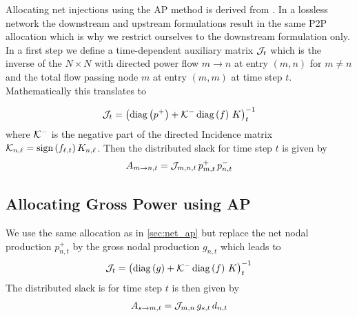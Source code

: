 \documentclass[11pt,twocolumn]{article}
\newcommand{\generation}{g_{s,t}}
\newcommand{\nodalgeneration}[1][n]{g_{#1,t}}
\newcommand{\demand}[1][n]{d_{#1,t}}
\newcommand{\incidence}[1][n]{K_{#1,\ell}}
\newcommand{\flow}{f_{\ell,t}}
\newcommand{\netconsumption}[1][n]{p^{-}_{#1,t}}
\newcommand{\netproduction}[1][n]{p^{+}_{#1,t}}
\newcommand{\allocatePeer}[1][s \rightarrow n]{A_{#1,t}}
\begin{document}
Allocating net injections using the AP method is derived from \cite{achayuthakan_electricity_2010-1}. In a lossless network the downstream and upstream formulations result in the same P2P allocation which is why we restrict ourselves to the downstream formulation only. In a first step we define a time-dependent auxiliary matrix $\mathcal{J}_t$ which is the inverse of the $N\times N$ with directed power flow $m \rightarrow n$ at entry $(m, n)$ for $m \ne n$ and the total flow passing node $m$ at entry $\left( m, m\right)$ at time step $t$. Mathematically this translates to


\begin{align}
\mathcal{J}_t = \left( \operatorname{diag}\left(p^+\right) + \mathcal{K}^- \operatorname{diag}\left(f\right) \, K \right)_t^{-1} 
\end{align}
where $\mathcal{K}^-$ is the negative part of the directed Incidence matrix $\DirectedIncidence_{n,\ell} = \text{sign}\left( \flow \right)  \incidence$. Then the distributed slack for time step $t$ is given by
\begin{align}
\allocatePeer[m \rightarrow n] = \InverseAPInjection_{m,n,t} \, \netproduction[m] \, \netconsumption
\end{align}

\subsection{Allocating Gross Power using AP}
\label{sec:gross_ap}

We use the same allocation as in \cref{sec:net_ap} but replace the net nodal production $\netproduction$ by the gross nodal production $\nodalgeneration$ which leads to  
\begin{align}
\mathcal{J}_t = \left( \operatorname{diag}\left(g\right) + \mathcal{K}^- \operatorname{diag}\left(f\right) \, K \right)_t^{-1} 
\end{align}
The distributed slack is for time step $t$ is then given by
\begin{align}
\allocatePeer[s \rightarrow m] = \InverseAPInjection_{m,n} \, \generation \, \demand
\end{align}



\clearpage
\printbibliography
\end{document}
